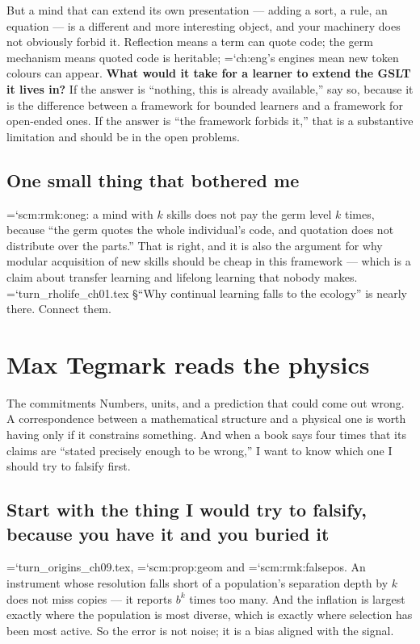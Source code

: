 \documentclass[11pt,letterpaper]{article}
\newcommand{\loc}[1]{{\small\ttfamily\color{accent}\hyphenchar\font=`\-\relax #1}}
\newcommand{\fnd}[1]{\textbf{\color{warn}#1}}
\begin{document}
But a mind that can extend its own presentation --- adding a sort, a
rule, an equation --- is a different and more interesting object, and
your machinery does not obviously forbid it. Reflection means a term
can quote code; the germ mechanism means quoted code is heritable;
\loc{ch:eng}'s engines mean new token colours can appear. \fnd{What
would it take for a learner to extend the GSLT it lives in?} If the
answer is ``nothing, this is already available,'' say so, because it is
the difference between a framework for bounded learners and a framework
for open-ended ones. If the answer is ``the framework forbids it,''
that is a substantive limitation and should be in the open problems.

\subsection*{One small thing that bothered me}

\loc{scm:rmk:oneg}: a mind with $k$ skills does not pay the germ level
$k$ times, because ``the germ quotes the whole individual's code, and
quotation does not distribute over the parts.'' That is right, and it
is also the argument for why modular acquisition of new skills should
be cheap in this framework --- which is a claim about transfer learning
and lifelong learning that nobody makes. \loc{turn\_rholife\_ch01.tex}
\S``Why continual learning falls to the ecology'' is nearly there.
Connect them.

\section{Max Tegmark reads the physics}
\label{sec:tegmark}

\begin{voice}{The commitments}
Numbers, units, and a prediction that could come out wrong. A
correspondence between a mathematical structure and a physical one is
worth having only if it constrains something. And when a book says
four times that its claims are ``stated precisely enough to be
wrong,'' I want to know which one I should try to falsify first.
\end{voice}

\subsection*{Start with the thing I would try to falsify, because you
have it and you buried it}

\loc{turn\_origins\_ch09.tex}, \loc{scm:prop:geom} and
\loc{scm:rmk:falsepos}. An instrument whose resolution falls short of a
population's separation depth by $k$ does not miss copies --- it
reports $b^{k}$ times too many. And the inflation is largest exactly
where the population is most diverse, which is exactly where selection
has been most active. So the error is not noise; it is a bias aligned
with the signal.
\end{document}
